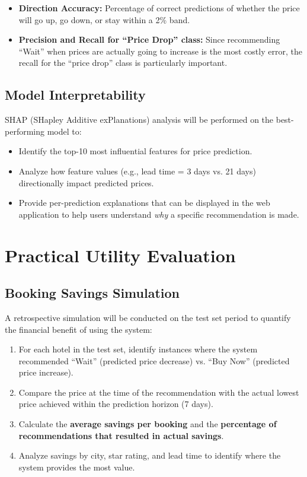 \documentclass[12pt,a4paper]{report}
\begin{document}
\begin{itemize}
    \item \textbf{Direction Accuracy:} Percentage of correct predictions of whether the price will go up, go down, or stay within a 2\% band.
    \item \textbf{Precision and Recall for ``Price Drop'' class:} Since recommending ``Wait'' when prices are actually going to increase is the most costly error, the recall for the ``price drop'' class is particularly important.
\end{itemize}

\subsection{Model Interpretability}

SHAP (SHapley Additive exPlanations) analysis \cite{lundberg2017} will be performed on the best-performing model to:
\begin{itemize}
    \item Identify the top-10 most influential features for price prediction.
    \item Analyze how feature values (e.g., lead time = 3 days vs. 21 days) directionally impact predicted prices.
    \item Provide per-prediction explanations that can be displayed in the web application to help users understand \textit{why} a specific recommendation is made.
\end{itemize}

\section{Practical Utility Evaluation}

\subsection{Booking Savings Simulation}

A retrospective simulation will be conducted on the test set period to quantify the financial benefit of using the system:

\begin{enumerate}
    \item For each hotel in the test set, identify instances where the system recommended ``Wait'' (predicted price decrease) vs. ``Buy Now'' (predicted price increase).
    \item Compare the price at the time of the recommendation with the actual lowest price achieved within the prediction horizon (7 days).
    \item Calculate the \textbf{average savings per booking} and the \textbf{percentage of recommendations that resulted in actual savings}.
    \item Analyze savings by city, star rating, and lead time to identify where the system provides the most value.
\end{enumerate}
\end{document}
